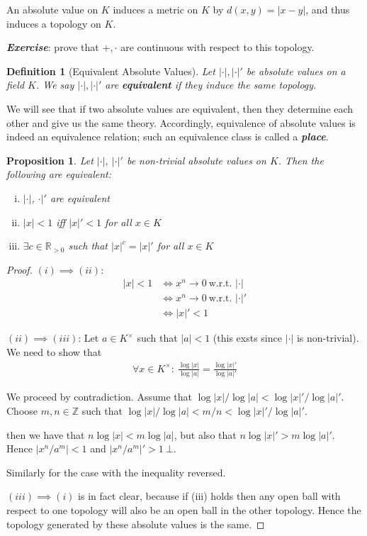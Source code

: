 \documentclass[]{article}
\theoremstyle{custhm}
\theoremstyle{cusdef}
\newtheorem{defin}[theorem]{Definition}
\theoremstyle{custhm}
\theoremstyle{custhm}
\theoremstyle{custhm}
\newtheorem{prop}[theorem]{Proposition}
\theoremstyle{custhm}
\theoremstyle{cusdef}
\theoremstyle{remark}
\newcommand{\Z}{\mathbb{Z}}
\newcommand{\R}{\mathbb{R}}
\newcommand{\ra}{\rightarrow}
\newcommand{\undf}[1]{\textit{\textbf{#1}}}
\begin{document}
An absolute value on $K$ induces a metric on $K$ by $d(x,y) = |x-y|$, and thus induces a topology on $K$.

\undf{Exercise}: prove that $+,\cdot$ are continuous with respect to this topology.

\begin{defin}[Equivalent Absolute Values]
Let $|\cdot|,|\cdot|'$ be absolute values on a field $K$. We say $|\cdot|,|\cdot|'$ are \undf{equivalent} if they induce the same topology.
\end{defin}

We will see that if two absolute values are equivalent, then they determine each other and give us the same theory. Accordingly, equivalence of absolute values is indeed an equivalence relation; such an equivalence class is called a \undf{place}.

\begin{prop}
	Let $|\cdot|,\ |\cdot|'$ be non-trivial absolute values on $K$. Then the following are equivalent:
	\begin{enumerate}[(i)]
		\item $|\cdot|$, $\cdot|'$ are equivalent
		\item $|x| < 1$ iff $|x|' < 1$ for all $x \in K$
		\item $\exists c\in\R_{>0}$ such that $|x|^c = |x|'$ for all $x\in K$
	\end{enumerate}
\end{prop}

\begin{proof}
$(i)\implies (ii)$:
\begin{align*}
|x| < 1 &\iff x^n \ra 0\ \textrm{w.r.t. }|\cdot|\\
&\iff x^n \ra 0\ \textrm{w.r.t. }|\cdot|'\\
&\iff |x|' < 1
\end{align*}

$(ii)\implies (iii)$: Let $a\in K^{\times}$ such that $|a| < 1$ (this exsts since $|\cdot|$ is non-trivial). We need to show that
\begin{align*}
	\forall x\in K^\times:\ \frac{\log|x|}{\log|a|} = \frac{\log|x|'}{\log|a|'}
\end{align*}

We proceed by contradiction. Assume that $\log|x|/\log|a| < \log|x|'/\log|a|'$. Choose $m,n\in\Z$ such that $\log|x|/\log|a| < m/n < \log|x|'/\log|a|'$.

then we have that $n\log|x| < m\log|a|$, but also that $n\log|x|' > m\log|a|'$. Hence $|x^n/a^m| < 1$ and $|x^n/a^m|' > 1\  \bot$.

Similarly for the case with the inequality reversed.

$(iii)\implies (i)$ is in fact clear, because if (iii) holds then any open ball with respect to one topology will also be an open ball in the other topology. Hence the topology generated by these absolute values is the same.
\end{proof}
\end{document}
